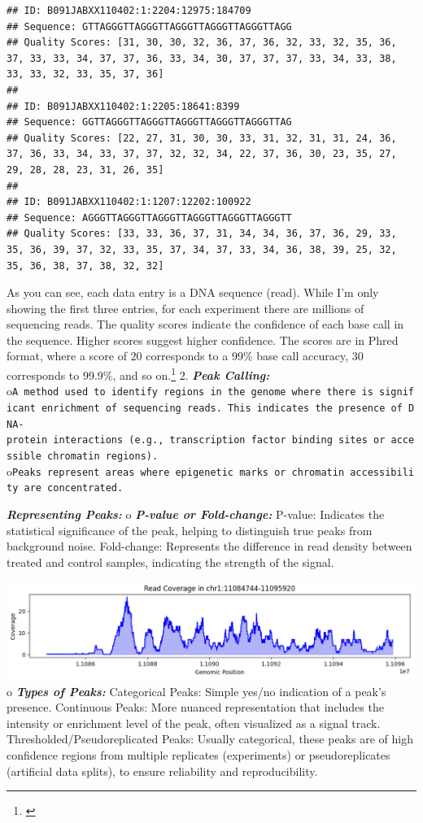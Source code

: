 \documentclass[
]{book}
\begin{document}
\begin{verbatim}
## ID: B091JABXX110402:1:2204:12975:184709
## Sequence: GTTAGGGTTAGGGTTAGGGTTAGGGTTAGGGTTAGG
## Quality Scores: [31, 30, 30, 32, 36, 37, 36, 32, 33, 32, 35, 36, 37, 33, 33, 34, 37, 37, 36, 33, 34, 30, 37, 37, 37, 33, 34, 33, 38, 33, 33, 32, 33, 35, 37, 36]
## 
## ID: B091JABXX110402:1:2205:18641:8399
## Sequence: GGTTAGGGTTAGGGTTAGGGTTAGGGTTAGGGTTAG
## Quality Scores: [22, 27, 31, 30, 30, 33, 31, 32, 31, 31, 24, 36, 37, 36, 33, 34, 33, 37, 37, 32, 32, 34, 22, 37, 36, 30, 23, 35, 27, 29, 28, 28, 23, 31, 26, 35]
## 
## ID: B091JABXX110402:1:1207:12202:100922
## Sequence: AGGGTTAGGGTTAGGGTTAGGGTTAGGGTTAGGGTT
## Quality Scores: [33, 33, 36, 37, 31, 34, 34, 36, 37, 36, 29, 33, 35, 36, 39, 37, 32, 33, 35, 37, 34, 37, 33, 34, 36, 38, 39, 25, 32, 35, 36, 38, 37, 38, 32, 32]
\end{verbatim}

As you can see, each data entry is a DNA sequence (read). While I'm only showing the first three entries, for each experiment there are millions of sequencing reads. The quality scores indicate the confidence of each base call in the sequence. Higher scores suggest higher confidence. The scores are in Phred format, where a score of 20 corresponds to a 99\% base call accuracy, 30 corresponds to 99.9\%, and so on.\footnote{\citet{green}}
2. \textbf{\emph{Peak Calling:}}
o\texttt{A\ method\ used\ to\ identify\ regions\ in\ the\ genome\ where\ there\ is\ significant\ enrichment\ of\ sequencing\ reads.\ This\ indicates\ the\ presence\ of\ DNA-protein\ interactions\ (e.g.,\ transcription\ factor\ binding\ sites\ or\ accessible\ chromatin\ regions).}
o\texttt{Peaks\ represent\ areas\ where\ epigenetic\ marks\ or\ chromatin\ accessibility\ are\ concentrated.}

\textbf{\emph{Representing Peaks:}}
o \textbf{\emph{P-value or Fold-change:}}
P-value: Indicates the statistical significance of the peak, helping to distinguish true peaks from background noise.
Fold-change: Represents the difference in read density between treated and control samples, indicating the strength of the signal.

\includegraphics{images/coverage_p.png}
o \textbf{\emph{Types of Peaks:}}
Categorical Peaks: Simple yes/no indication of a peak's presence.
Continuous Peaks: More nuanced representation that includes the intensity or enrichment level of the peak, often visualized as a signal track.
Thresholded/Pseudoreplicated Peaks: Usually categorical, these peaks are of high confidence regions from multiple replicates (experiments) or pseudoreplicates (artificial data splits), to ensure reliability and reproducibility.
\end{document}

